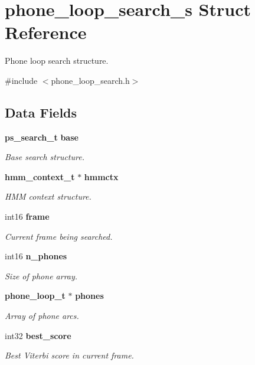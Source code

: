 \section{phone\-\_\-loop\-\_\-search\-\_\-s Struct Reference}
\label{structphone__loop__search__s}


Phone loop search structure.  




{\ttfamily \#include $<$phone\-\_\-loop\-\_\-search.\-h$>$}

\subsection*{Data Fields}
\begin{DoxyCompactItemize}
\item 
{\bf ps\-\_\-search\-\_\-t} {\bf base}
\begin{DoxyCompactList}\small\item\em Base search structure. \end{DoxyCompactList}\item 
{\bf hmm\-\_\-context\-\_\-t} $\ast$ {\bf hmmctx}
\begin{DoxyCompactList}\small\item\em H\-M\-M context structure. \end{DoxyCompactList}\item 
int16 {\bf frame}
\begin{DoxyCompactList}\small\item\em Current frame being searched. \end{DoxyCompactList}\item 
int16 {\bf n\-\_\-phones}
\begin{DoxyCompactList}\small\item\em Size of phone array. \end{DoxyCompactList}\item 
{\bf phone\-\_\-loop\-\_\-t} $\ast$ {\bf phones}
\begin{DoxyCompactList}\small\item\em Array of phone arcs. \end{DoxyCompactList}\item 
int32 {\bf best\-\_\-score}
\begin{DoxyCompactList}\small\item\em Best Viterbi score in current frame. \end{DoxyCompactList}\item 

\end{DoxyCompactItemize}
